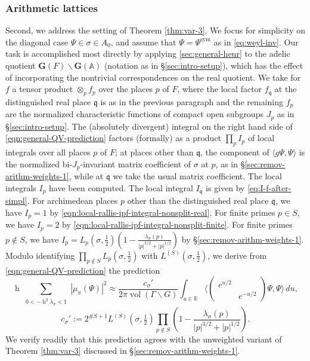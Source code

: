 \documentclass[reqno,10pt]{amsart}
\theoremstyle{plain} %
\theoremstyle{definition}
\theoremstyle{plain} %
\theoremstyle{remark}
\theoremstyle{itplain} %
\theoremstyle{remark} %
\numberwithin{equation}{section}
\DeclareMathOperator{\sym}{sym}
\DeclareMathOperator{\vol}{vol}
\DeclareMathOperator{\h}{h}
\begin{document}
\subsubsection{Arithmetic lattices}\label{sec:35ac3e57af}
Second, we address the setting of Theorem \ref{thm:var-3}.  We focus for simplicity on the diagonal case $\Psi \in \sigma \in A_0$, and assume that $\Psi = \Psi^{\sym}$ as in \eqref{eq:weyl-inv}.  Our task is accomplished most directly by applying \eqref{sec:general-heur} to the adelic quotient $\mathbf{G}(F) \backslash \mathbf{G}(\mathbb{A})$ (notation as in \S\ref{sec:intro-setup}), which has the effect of incorporating the nontrivial correspondences on the real quotient.  We take for $f$ a tensor product $\otimes_p f_p$ over the places $p$ of $F$, where the local factor $f_\mathfrak{q}$ at the distinguished real place $\mathfrak{q}$ is as in the previous paragraph and the remaining $f_p$ are the normalized characteristic functions of compact open subgroups $J_p$ as in \S\ref{sec:intro-setup}.  The (absolutely divergent) integral on the right hand side of \eqref{eqn:general-QV-prediction} factors (formally) as a product $\prod_p I_p$ of local integrals over all places $p$ of $F$; at places other than $\mathfrak{q}$, the component of $\langle g \Psi, \Psi \rangle$ is the normalized bi-$J_p$-invariant matrix coefficient of $\sigma$ at $p$, as in \S\ref{sec:remov-arithm-weights-1}, while at $\mathfrak{q}$ we take the usual matrix coefficient.  The local integrals $I_p$ have been computed.  The local integral $I_\mathfrak{q}$ is given by \eqref{eq:I-f-after-simpl}.  For archimedean places $p$ other than the distinguished real place $\mathfrak{q}$, we have $I_p = 1$ by \eqref{eqn:local-rallis-ipf-integral-nonsplit-real}.  For finite primes $p \in S$, we have $I_p = 2$ by \eqref{eqn:local-rallis-ipf-integral-nonsplit-finite}.  For finite primes $p \notin S$, we have $I_p = L_p(\sigma,\tfrac{1}{2} ) (1 - \frac{\lambda_\sigma(p)}{|p|^{3/2} + |p|^{1/2}})$ by \S\ref{sec:remov-arithm-weights-1}.  Modulo identifying $\prod_{p \notin S} L_p(\sigma,\tfrac{1}{2} )$ with $L^{(S)}(\sigma,\tfrac{1}{2} )$, we derive from \eqref{eqn:general-QV-prediction} the prediction
\begin{equation*}
  \h
  \sum_{
    \substack{
      0 < -\h^2 \lambda_\pi < 1
    }
  }
  | \mu_\pi(\Psi) |^2
  \approx
  \frac{  c_\sigma ' }{2 \pi \vol(\Gamma \backslash G)}
  \int_{u \in \mathbb{R}}
  \langle \begin{pmatrix}
    e^{u/2} &  \\
    & e^{-u/2}
  \end{pmatrix} \Psi, \Psi \rangle \, d u,
\end{equation*}
\begin{equation*}
  c_\sigma '
  :=
  2^{\# S + 1}
  L^{(S)}(\sigma,\tfrac{1}{2} )
  \prod_{p \notin S}
  (1 - \frac{\lambda_\sigma(p)}{|p|^{3/2} +
    |p|^{1/2}}).
\end{equation*}
We verify readily that this prediction agrees with the unweighted variant of Theorem \ref{thm:var-3} discussed in \S\ref{sec:remov-arithm-weights-1}.
\end{document}

